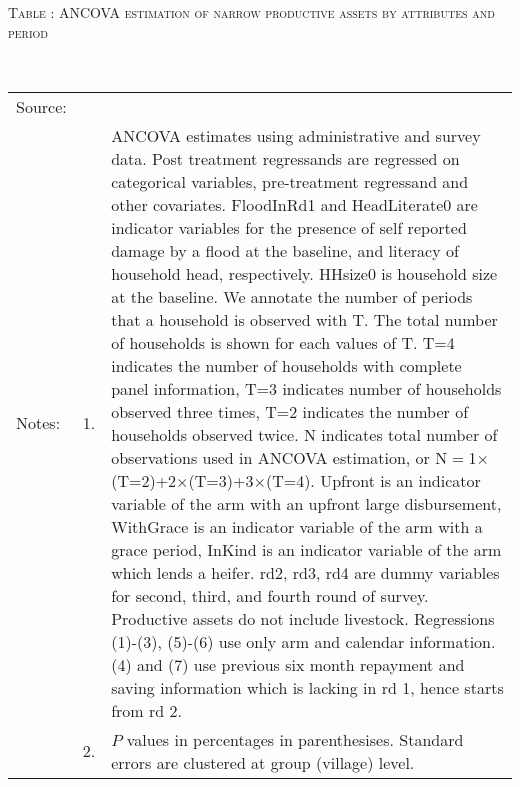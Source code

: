 \hspace{-1cm}\begin{minipage}[t]{14cm}
\hfil\textsc{\normalsize Table \thetable: ANCOVA estimation of narrow productive assets by attributes and period\label{tab ANCOVA narrow productive assets timevarying attributes}}\\
\setlength{\tabcolsep}{1pt}
\setlength{\baselineskip}{8pt}
\renewcommand{\arraystretch}{.55}
\hfil{}\\
\renewcommand{\arraystretch}{.8}
\setlength{\tabcolsep}{1pt}
\begin{tabular}{>{\hfill\scriptsize}p{1cm}<{}>{\hfill\scriptsize}p{.25cm}<{}>{\scriptsize}p{12cm}<{\hfill}}
Source:& \multicolumn{2}{l}{\scriptsize Estimated with GUK administrative and survey data.}\\
Notes: & 1. & ANCOVA estimates using administrative and survey data. Post treatment regressands are regressed on categorical variables, pre-treatment regressand and other covariates. \textsf{FloodInRd1} and \textsf{HeadLiterate0} are indicator variables for the presence of self reported damage by a flood at the baseline, and literacy of household head, respectively. \textsf{HHsize0} is household size at the baseline. We annotate the number of periods that a household is observed with \textsf{T}. The total number of households is shown for each values of \textsf{T}. \textsf{T=4} indicates the number of households with complete panel information, \textsf{T=3} indicates number of households observed three times, \textsf{T=2} indicates the number of households observed twice. \textsf{N} indicates total number of observations used in ANCOVA estimation, or \textsf{N$=$1$\times$(T=2)+2$\times$(T=3)+3$\times$(T=4)}.  \textsf{Upfront} is an indicator variable of the arm with an upfront large disbursement, \textsf{WithGrace} is an indicator variable of the arm with a grace period, \textsf{InKind} is an indicator variable of the arm which lends a heifer. \textsf{rd2, rd3, rd4} are dummy variables for second, third, and fourth round of survey. Productive assets do not include livestock. Regressions (1)-(3), (5)-(6) use only arm and calendar information. (4) and (7) use previous six month repayment and saving information which is lacking in rd 1, hence starts from rd 2.\\
& 2. & $P$ values in percentages in parenthesises. Standard errors are clustered at group (village) level.
\end{tabular}
\end{minipage}


